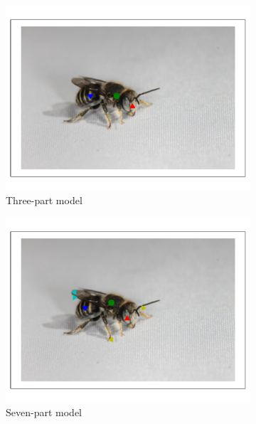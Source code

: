 \documentclass[11pt, oneside]{report}
\begin{document}
        \begin{figure}[p]
            \centering
            \begin{subfigure}[b]{0.45\textwidth}
                \centering
                \includegraphics[width=\textwidth]{hog4_1.pdf}
                \caption{Three-part model}
            \end{subfigure}
            \begin{subfigure}[b]{0.45\textwidth}
                \centering
                \includegraphics[width=\textwidth]{7p_1.pdf}
                \caption{Seven-part model}
            \end{subfigure}
            \begin{subfigure}[b]{0.45\textwidth}

\end{subfigure}
\end{figure}
\end{document}
